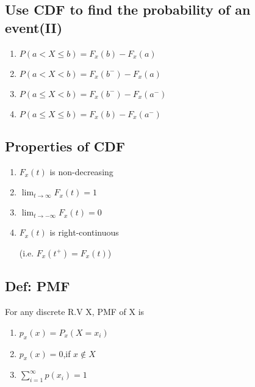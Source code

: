     \subsection*{Use CDF to find the probability of an event(II)}
        \begin{enumerate}
            \item $P(a<X\leq b)=F_x(b)-F_x(a)$
            \item $P(a<X<b)=F_x(b^-)-F_x(a)$
            \item $P(a\leq X<b)=F_x(b^-)-F_x(a^-)$
            \item $P(a\leq X\leq b)=F_x(b)-F_x(a^-)$
        \end{enumerate} 

    \subsection*{Properties of CDF}
        \begin{enumerate}
            \item $F_x(t)$ is non-decreasing
            \item $\lim_{t \to \infty}F_x(t)=1$
            \item $\lim_{t \to -\infty}F_x(t)=0$
            \item $F_x(t)$ is right-continuous 
            
            (i.e. $F_x(t^+)=F_x(t)$)
        \end{enumerate}

    \subsection*{Def: PMF}
        For any discrete R.V X, PMF of X is\\
        \begin{enumerate}
            \item $p_x(x)=P_x(X=x_i)$
            \item $p_x(x)=0$,if $x\notin X$
            \item $\sum_{i=1}^{\infty}p(x_i)=1$
        \end{enumerate}


    
    